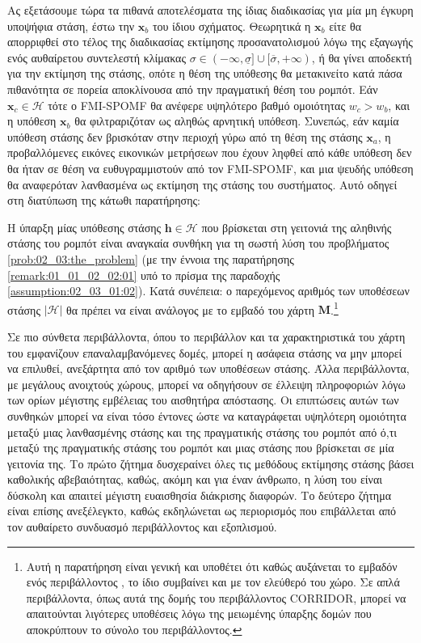Ας εξετάσουμε τώρα τα πιθανά αποτελέσματα της ίδιας διαδικασίας για μία μη
έγκυρη υποψήφια στάση, έστω την $\bm{x}_b$ του ίδιου σχήματος. Θεωρητικά η
$\bm{x}_b$ είτε θα απορριφθεί στο τέλος της διαδικασίας εκτίμησης
προσανατολισμού λόγω της εξαγωγής ενός αυθαίρετου συντελεστή κλίμακας $\sigma
\in (-\infty, \underline{\sigma}] \cup [\overline{\sigma}, +\infty)$, ή θα
γίνει αποδεκτή για την εκτίμηση της στάσης, οπότε η θέση της υπόθεσης θα
μετακινείτο κατά πάσα πιθανότητα σε πορεία αποκλίνουσα από την πραγματική θέση
του ρομπότ. Εάν $\bm{x}_c \in \mathcal{H}$ τότε ο FMI-SPOMF θα ανέφερε
υψηλότερο βαθμό ομοιότητας $w_c > w_b$, και η υπόθεση $\bm{x}_b$ θα
φιλτραριζόταν ως αληθώς αρνητική υπόθεση. Συνεπώς, εάν καμία υπόθεση στάσης δεν
βρισκόταν στην περιοχή γύρω από τη θέση της στάσης $\bm{x}_a$, η προβαλλόμενες
εικόνες εικονικών μετρήσεων που έχουν ληφθεί από κάθε υπόθεση δεν θα ήταν σε
θέση να ευθυγραμμιστούν από τον FMI-SPOMF, και μια ψευδής υπόθεση θα αναφερόταν
λανθασμένα ως εκτίμηση της στάσης του συστήματος. Αυτό οδηγεί στη διατύπωση της
κάτωθι παρατήρησης:

\begin{remark}
  \label{appendix:remark:02_03_04:hypotheses_number}
  Η ύπαρξη μίας υπόθεσης στάσης $\bm{h} \in \mathcal{H}$ που βρίσκεται στη
  γειτονιά της αληθινής στάσης του ρομπότ είναι αναγκαία συνθήκη για τη σωστή
  λύση του προβλήματος \ref{prob:02_03:the_problem} (με την έννοια της
  παρατήρησης \ref{remark:01_01_02_02:01} υπό το πρίσμα της παραδοχής
  \ref{assumption:02_03_01:02}). Κατά συνέπεια: ο παρεχόμενος αριθμός των
  υποθέσεων στάσης $|\mathcal{H}|$ θα πρέπει να είναι ανάλογος με το εμβαδό
  του χάρτη $\bm{M}$.\footnote{Αυτή η παρατήρηση είναι γενική και υποθέτει ότι καθώς
  αυξάνεται το εμβαδόν ενός περιβάλλοντος , το ίδιο συμβαίνει και με τον ελεύθερό
  του χώρο. Σε απλά περιβάλλοντα, όπως αυτά της δομής του περιβάλλοντος
  CORRIDOR, μπορεί να απαιτούνται λιγότερες υποθέσεις λόγω της μειωμένης
  ύπαρξης δομών που αποκρύπτουν το σύνολο του περιβάλλοντος.}
\end{remark}

Σε πιο σύνθετα περιβάλλοντα, όπου το περιβάλλον και τα χαρακτηριστικά του χάρτη
του εμφανίζουν επαναλαμβανόμενες δομές, μπορεί η ασάφεια στάσης να μην μπορεί
να επιλυθεί, ανεξάρτητα από τον αριθμό των υποθέσεων στάσης. Άλλα περιβάλλοντα,
με μεγάλους ανοιχτούς χώρους, μπορεί να οδηγήσουν σε έλλειψη πληροφοριών λόγω
των ορίων μέγιστης εμβέλειας του αισθητήρα απόστασης. Οι επιπτώσεις αυτών των
συνθηκών μπορεί να είναι τόσο έντονες ώστε να καταγράφεται υψηλότερη ομοιότητα
μεταξύ μιας λανθασμένης στάσης και της πραγματικής στάσης του ρομπότ από ό,τι
μεταξύ της πραγματικής στάσης του ρομπότ και μιας στάσης που βρίσκεται σε μία
γειτονία της. Το πρώτο ζήτημα δυσχεραίνει όλες τις μεθόδους εκτίμησης στάσης
βάσει καθολικής αβεβαιότητας, καθώς, ακόμη και για έναν άνθρωπο, η λύση του
είναι δύσκολη και απαιτεί μέγιστη ευαισθησία διάκρισης διαφορών. Το δεύτερο
ζήτημα είναι επίσης ανεξέλεγκτο, καθώς εκδηλώνεται ως περιορισμός που
επιβάλλεται από τον αυθαίρετο συνδυασμό περιβάλλοντος και εξοπλισμού.
